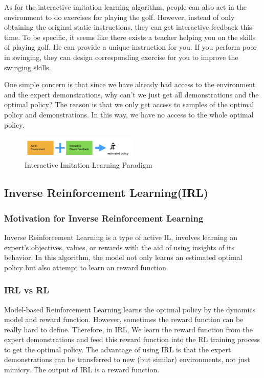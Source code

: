 \documentclass[11pt]{article}
\begin{document}
As for the interactive imitation learning algorithm, people can also act in the environment to do exercises for playing the golf. However, instead of only obtaining the original static instructions, they can get interactive feedback this time. To be specific, it seems like there exists a teacher helping you on the skills of playing golf. He can provide a unique instruction for you. If you perform poor in swinging, they can design corresponding exercise for you to improve the swinging skills.

One simple concern is that since we have already had access to the environment and the expert demonstrations, why can't we just get all demonstrations and the optimal policy? The reason is that we only get access to samples of the optimal policy and demonstrations. In this way, we have no access to the whole optimal policy.

\begin{figure}[h]
\centering
\includegraphics[width=0.5\textwidth]{Interactive.png}
\caption{Interactive Imitation Learning Paradigm}
\end{figure} 

\subsection{Inverse Reinforcement Learning(IRL)}
\subsubsection{Motivation for Inverse Reinforcement Learning}
\normalfont
Inverse Reinforcement Learning is a type of active IL, involves learning an expert’s objectives, values, or rewards with the aid of using insights of its behavior. In this algorithm, the model not only learns an estimated optimal policy but also attempt to learn an reward function. 

\subsubsection{IRL vs RL}
Model-based Reinforcement Learning learns the optimal policy by the dynamics model and reward function. However, sometimes the reward function can be really hard to define. Therefore, in IRL, We learn the reward function from the expert demonstrations and feed this reward function into the RL training process to get the optimal policy. The advantage of using IRL is that the expert demonstrations can be transferred to new (but similar) environments, not just mimicry. The output of IRL is a reward function. 
\end{document}
